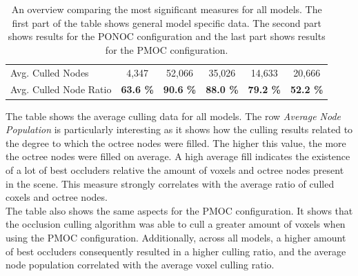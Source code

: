 \begin{table}[!htb]
\begin{tabular}{|lccccc|}
    \multicolumn{1}{|l|}{Avg. Culled Nodes}         & \multicolumn{1}{c|}{4,347}                    & \multicolumn{1}{c|}{52,066}                   & \multicolumn{1}{c|}{35,026}           & \multicolumn{1}{c|}{14,633}               & \multicolumn{1}{c|}{20,666}               \\
    \multicolumn{1}{|l|}{Avg. Culled Node Ratio}    & \multicolumn{1}{c|}{\textbf{63.6 \%}}         & \multicolumn{1}{c|}{\textbf{90.6 \%}}         & \multicolumn{1}{c|}{\textbf{88.0 \%}} & \multicolumn{1}{c|}{\textbf{79.2 \%}}     & \multicolumn{1}{c|}{\textbf{52.2 \%}}     \\ \hline
    
  \end{tabular}
  \caption{An overview comparing the most significant measures for all models. 
  The first part of the table shows general model specific data. The second part shows results for the 
  \ac{PONOC} configuration and the last part shows results for the \ac{PMOC} configuration.}
  \label{tbl:culling-result-overview}
\end{table}
  
\noindent
The table shows the average culling data for all models. The row \emph{Average Node Population} is 
particularly interesting as it shows how the culling results related to the degree to which the octree 
nodes were filled. The higher this value, the more the octree nodes were filled on average. A high 
average fill indicates the existence of a lot of best occluders relative the amount of voxels and 
octree nodes present in the scene. This measure strongly correlates with the average ratio of culled 
coxels and octree nodes. \\

\noindent
The table also shows the same aspects for the \ac{PMOC} configuration. It shows that the 
occlusion culling algorithm was able to cull a greater amount of voxels when using the \ac{PMOC} 
configuration. Additionally, across all models, a higher amount of best occluders consequently resulted in a 
higher culling ratio, and the average node population correlated with the average voxel culling ratio.

